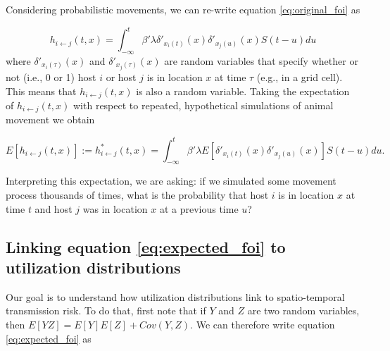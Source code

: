 \documentclass[letterpaper]{article}
\begin{document}
Considering probabilistic movements, we can re-write equation \ref{eq:original_foi} as

\begin{equation}
    h_{i \leftarrow j}(t, x) = \int_{-\infty}^{t} \beta' \lambda \delta'_{x_i(t)}(x) \delta'_{x_j(u)}(x) S(t - u) du
    \label{eq:prob_foi}
\end{equation}
where $\delta'_{x_i(\tau)}(x)$ and $\delta'_{x_j(\tau)}(x)$ are random variables that specify whether or not (i.e., 0 or 1) host $i$ or host $j$ is in location $x$ at time $\tau$ (e.g., in a grid cell).  This means that $h_{i \leftarrow j}(t, x)$ is also a random variable. Taking the expectation of $h_{i \leftarrow j}(t, x)$ with respect to repeated, hypothetical simulations of animal movement we obtain

\begin{equation}
    E[h_{i \leftarrow j}(t, x)] := h^*_{i \leftarrow j}(t, x) = \int_{-\infty}^{t} \beta' \lambda E[\delta'_{x_i(t)}(x) \delta'_{x_j(u)}(x)] S(t - u) du.
    \label{eq:expected_foi}
\end{equation}

Interpreting this expectation, we are asking: if we simulated some movement process thousands of times, what is the probability that host $i$ is in location $x$ at time $t$ and host $j$ was in location $x$ at a previous time $u$? 

\subsection*{Linking equation \ref{eq:expected_foi} to utilization distributions}

Our goal is to understand how utilization distributions link to spatio-temporal transmission risk.  To do that, first note that if $Y$ and $Z$ are two random variables, then $E[YZ] = E[Y]E[Z] + Cov(Y, Z)$.  We can therefore write equation \ref{eq:expected_foi} as
\end{document}
